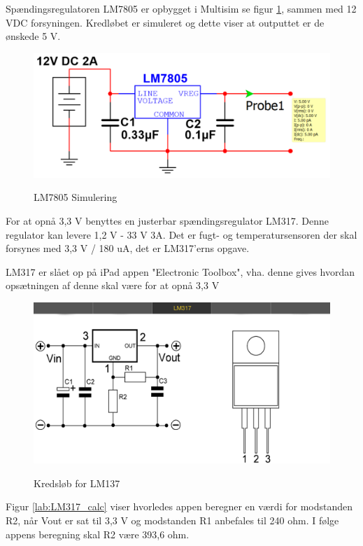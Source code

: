 Spændingsregulatoren LM7805 er opbygget i Multisim se figur \ref{lab:LM7805_SIMULERING}, sammen med 12 VDC forsyningen. Kredløbet er simuleret og dette viser at outputtet er de ønskede 5 V.

\begin{figure}[H] \centering
{\includegraphics[width=\textwidth]{filer/design/Billeder/LM7805_SIMULATION}}
\caption{LM7805 Simulering}
\label{lab:LM7805_SIMULERING}
\raggedright
\end{figure}


For at opnå 3,3 V benyttes en justerbar spændingsregulator LM317. Denne regulator kan levere 1,2 V - 33 V 3A. Det er fugt- og temperatursensoren der skal forsynes med 3,3 V / 180 uA, det er LM317'erns opgave. 

LM317 er slået op på iPad appen "Electronic Toolbox", vha. denne gives hvordan opsætningen af denne skal være for at opnå 3,3 V 
 
\begin{figure}[H] \centering
{\includegraphics[width=\textwidth]{filer/design/Billeder/LM317}}
\caption{Kredsløb for LM137}
\label{lab:LM317}
\raggedright
\end{figure}

Figur \ref{lab:LM317_calc} viser hvorledes appen beregner en værdi for modstanden R2, når Vout er sat til 3,3 V og modstanden R1 anbefales til 240 ohm. I følge appens beregning skal R2 være 393,6 ohm.

